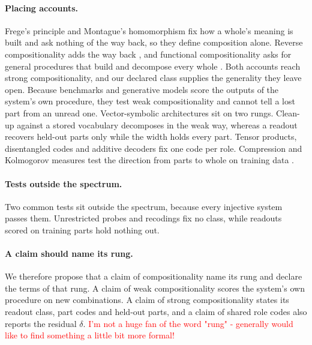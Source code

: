\documentclass[10pt]{article}
\newcommand{\note}[1]{\textcolor{red}{#1}}
\theoremstyle{plain}
\theoremstyle{remark}
\begin{document}
\paragraph{Placing accounts.} Frege's principle and Montague's homomorphism fix how a whole's meaning is built and ask nothing of the way back, so they define composition alone. Reverse compositionality adds the way back \citep{fodor2002}, and functional compositionality asks for general procedures that build and decompose every whole \citep{vangelder1990}. Both accounts reach strong compositionality, and our declared class supplies the generality they leave open. Because benchmarks and generative models score the outputs of the system's own procedure, they test weak compositionality and cannot tell a lost part from an unread one. Vector-symbolic architectures sit on two rungs. Clean-up against a stored vocabulary decomposes in the weak way, whereas a readout recovers held-out parts only while the width holds every part. Tensor products, disentangled codes and additive decoders fix one code per role. Compression and Kolmogorov measures test the direction from parts to whole on training data \citep{andreas2019,elmoznino2024,elmoznino2026}.

\paragraph{Tests outside the spectrum.} Two common tests sit outside the spectrum, because every injective system passes them. Unrestricted probes and recodings fix no class, while readouts scored on training parts hold nothing out.

\paragraph{A claim should name its rung.} We therefore propose that a claim of compositionality name its rung and declare the terms of that rung. A claim of weak compositionality scores the system's own procedure on new combinations. A claim of strong compositionality states its readout class, part codes and held-out parts, and a claim of shared role codes also reports the residual $\delta$. \note{I'm not a huge fan of the word "rung" - generally would like to find something a little bit more formal!}
\end{document}

